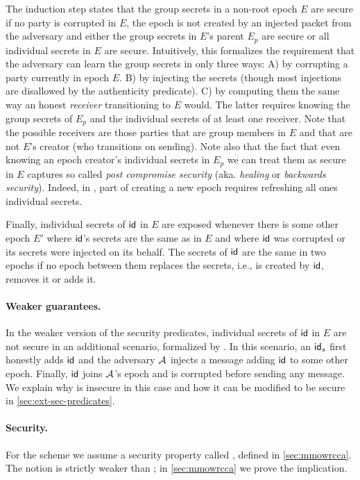 The induction step states that the group secrets in a non-root epoch $E$
are secure if no party is corrupted in $E$, the epoch is not created
by an injected packet from the adversary and either the group secrets in
$E$'s parent $E_p$ are secure or all individual secrets in
$E$ are secure. Intuitively, this formalizes the requirement that the
adversary can learn the group secrets in only three ways: A) by corrupting a
party currently in epoch $E$. B) by injecting the secrets (though
most injections are disallowed by the authenticity predicate). C) by
computing them the same way an honest \emph{receiver} transitioning to
$E$ would. The latter requires knowing the group secrets of
$E_p$ and the individual secrets of at least one receiver. Note that
the possible receivers are those parties that are group members in
$E$ and that are not $E$'s creator (who transitions on
sending). Note also that the fact that even knowing an epoch creator's individual
secrets in $E_p$ we can treat them as secure in $E$ captures
so called \emph{post compromise security} (aka. \emph{healing} or
\emph{backwards security}). Indeed, in \saik, part of creating a new epoch
requires refreshing all ones individual secrets.

Finally, individual secrets of ${\mathsf{id}}$ in $E$ are exposed whenever
there is some other epoch $E'$ where ${\mathsf{id}}$'s secrets are the same as
in $E$ and where ${\mathsf{id}}$ was corrupted or its secrets were injected on
its behalf. The secrets of ${\mathsf{id}}$ are the same in two epochs if no epoch between them replaces the secrets, i.e., is created by ${\mathsf{id}}$, removes
it or adds it.

\paragraph{Weaker guarantees.}
In the weaker version of the security predicates, individual secrets of ${\mathsf{id}}$
in $E$ are not secure in an additional scenario, formalized by
\safeWeakAdd. In this scenario, an ${\mathsf{id}}_s$ first honestly adds ${\mathsf{id}}$ and the
adversary $\mathcal{A}_{\relax}$ injects a message adding ${\mathsf{id}}$ to some other epoch. Finally,
${\mathsf{id}}$ joins $\mathcal{A}_{\relax}$'s epoch and is corrupted before sending any message. We explain why \saik is insecure in this case and how it can be modified to be secure in
\cref{sec:ext-sec-predicates}.

\paragraph{Security.} 
For the \mmPKE scheme we assume a security property called \mmowrcca, defined in \cref{sec:mmowrcca}. The notion is strictly weaker than \mmindcca; in \cref{sec:mmowrcca} we prove the implication.

